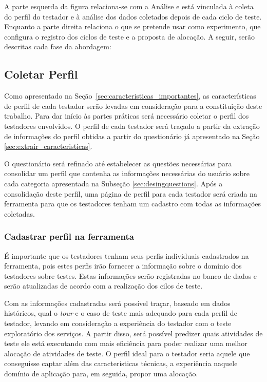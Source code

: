 	
A parte esquerda da figura relaciona-se com a Análise e está vinculada à coleta do perfil do testador e à análise dos dados coletados depois de cada ciclo de teste. Enquanto a parte direita relaciona o que se pretende usar como experimento, que configura o registro dos ciclos de teste e a proposta de alocação. A seguir, serão descritas cada fase da abordagem:

\subsection{Coletar Perfil}

Como apresentado na Seção~\ref{sec:caracteristicas_importantes}, as características de perfil de cada testador serão levadas em consideração para a constituição deste trabalho. Para dar início às partes práticas será necessário coletar o perfil dos testadores envolvidos. O perfil de cada testador será traçado a partir da extração de informações do perfil obtidas a partir do questionário já apresentado na Seção \ref{sec:extrair_caracteristicas}.

O questionário será refinado até estabelecer as questões necessárias para consolidar um perfil que contenha as informações necessárias do usuário sobre cada categoria apresentada na Subseção \ref{sec:desingquestions}. Após a consolidação deste perfil, uma página de perfil para cada testador será criada na ferramenta \itractool para que os testadores tenham um cadastro com todas as informações coletadas. 

\subsubsection{Cadastrar perfil na ferramenta \itractool}

É importante que os testadores tenham seus perfis individuais cadastrados na ferramenta, pois estes perfis irão fornecer a informação sobre o domínio dos testadores sobre testes. Estas informações serão registradas no banco de dados e serão atualizadas de acordo com a realização dos cilos de teste. 

Com as informações cadastradas será possível traçar, baseado em dados históricos, qual o \textit{tour} e o caso de teste mais adequado para cada perfil de testador, levando em consideração a experiência do testador com o teste exploratório dos serviços. A partir disso, será possível predizer quais atividades de teste ele está executando com mais eficiência para poder realizar uma melhor alocação de atividades de teste. O perfil ideal para o testador seria aquele que conseguisse captar além das características técnicas, a experiência naquele domínio de aplicação para, em seguida, propor uma alocação. 

